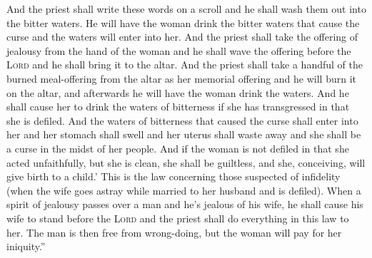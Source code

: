 \begin{inparaenum}
     And the priest shall write these words on a scroll and he shall wash them out into the bitter waters.%
     He will have the woman drink the bitter waters that cause the curse and the waters will enter into her.%
     And the priest shall take the offering of jealousy from the hand of the woman and he shall wave the offering before the \textsc{Lord} and he shall bring it to the altar.%
     And the priest shall take a handful of the burned meal-offering from the altar as her memorial offering and he will burn it on the altar, and afterwards he will have the woman drink the waters.%
     And he shall cause her to drink the waters of bitterness if she has transgressed in that she is defiled. And the waters of bitterness that caused the curse shall enter into her and her stomach shall swell and her uterus shall waste away and she shall be a curse in the midst of her people.%
     And if the woman is not defiled in that she acted unfaithfully, but she is clean, she shall be guiltless, and she, conceiving, will give birth to a child.'%
     This is the law concerning those suspected of infidelity (when the wife goes astray while married to her husband and is defiled).%
     When a spirit of jealousy passes over a man and he's jealous of his wife, he shall cause his wife to stand before the \textsc{Lord} and the priest shall do everything in this law to her.%
     The man is then free from wrong-doing, but the woman will pay for her iniquity.''%
\end{inparaenum}
